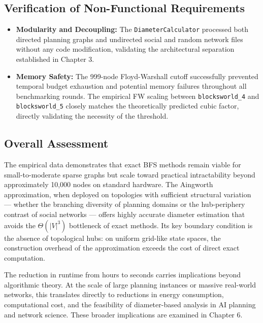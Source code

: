 \subsection{Verification of Non-Functional Requirements}

\begin{itemize}
    \item \textbf{Modularity and Decoupling:} The \texttt{DiameterCalculator} processed both directed planning graphs and undirected social and random network files without any code modification, validating the architectural separation established in Chapter 3.

    \item \textbf{Memory Safety:} The 999-node Floyd-Warshall cutoff successfully prevented temporal budget exhaustion and potential memory failures throughout all benchmarking rounds. The empirical FW scaling between \texttt{blocksworld\_4} and \texttt{blocksworld\_5} closely matches the theoretically predicted cubic factor, directly validating the necessity of the threshold.
\end{itemize}

\subsection{Overall Assessment}

The empirical data demonstrates that exact BFS methods remain viable for small-to-moderate sparse graphs but scale toward practical intractability beyond approximately 10,000 nodes on standard hardware. The Aingworth approximation, when deployed on topologies with sufficient structural variation --- whether the branching diversity of planning domains or the hub-periphery contrast of social networks --- offers highly accurate diameter estimation that avoids the $\Theta(|V|^3)$ bottleneck of exact methods. Its key boundary condition is the absence of topological hubs: on uniform grid-like state spaces, the construction overhead of the approximation exceeds the cost of direct exact computation.

The reduction in runtime from hours to seconds carries implications beyond algorithmic theory. At the scale of large planning instances or massive real-world networks, this translates directly to reductions in energy consumption, computational cost, and the feasibility of diameter-based analysis in AI planning and network science. These broader implications are examined in Chapter 6.